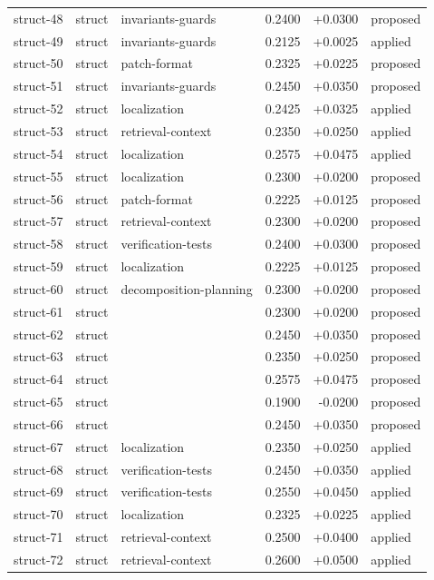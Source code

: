 \begin{center}
\begin{longtable}{llp{5.2cm}rrl}
struct-48 & struct & invariants-guards & 0.2400 & +0.0300 & proposed \\
struct-49 & struct & invariants-guards & 0.2125 & +0.0025 & applied \\
struct-50 & struct & patch-format & 0.2325 & +0.0225 & proposed \\
struct-51 & struct & invariants-guards & 0.2450 & +0.0350 & proposed \\
struct-52 & struct & localization & 0.2425 & +0.0325 & applied \\
struct-53 & struct & retrieval-context & 0.2350 & +0.0250 & applied \\
struct-54 & struct & localization & 0.2575 & +0.0475 & applied \\
struct-55 & struct & localization & 0.2300 & +0.0200 & proposed \\
struct-56 & struct & patch-format & 0.2225 & +0.0125 & proposed \\
struct-57 & struct & retrieval-context & 0.2300 & +0.0200 & proposed \\
struct-58 & struct & verification-tests & 0.2400 & +0.0300 & proposed \\
struct-59 & struct & localization & 0.2225 & +0.0125 & proposed \\
struct-60 & struct & decomposition-planning & 0.2300 & +0.0200 & proposed \\
struct-61 & struct &  & 0.2300 & +0.0200 & proposed \\
struct-62 & struct &  & 0.2450 & +0.0350 & proposed \\
struct-63 & struct &  & 0.2350 & +0.0250 & proposed \\
struct-64 & struct &  & 0.2575 & +0.0475 & proposed \\
struct-65 & struct &  & 0.1900 & -0.0200 & proposed \\
struct-66 & struct &  & 0.2450 & +0.0350 & proposed \\
struct-67 & struct & localization & 0.2350 & +0.0250 & applied \\
struct-68 & struct & verification-tests & 0.2450 & +0.0350 & applied \\
struct-69 & struct & verification-tests & 0.2550 & +0.0450 & applied \\
struct-70 & struct & localization & 0.2325 & +0.0225 & applied \\
struct-71 & struct & retrieval-context & 0.2500 & +0.0400 & applied \\
struct-72 & struct & retrieval-context & 0.2600 & +0.0500 & applied \\

\end{longtable}
\end{center}
